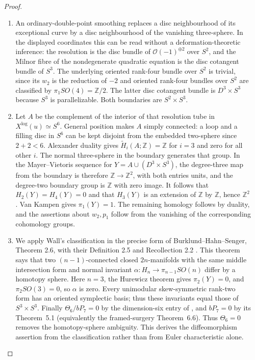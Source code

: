 \begin{proof}
\begin{enumerate}[label=\arabic*.,leftmargin=*]
\item An ordinary-double-point smoothing replaces a disc neighbourhood
of its exceptional curve by a disc neighbourhood of the vanishing
three-sphere. In the displayed coordinates this can be read
without a deformation-theoretic inference: the resolution is the
disc bundle of $\mathcal O(-1)^{\oplus2}$ over $S^2$, and the
Milnor fibre of the nondegenerate quadratic equation is the disc
cotangent bundle of $S^3$. The underlying oriented rank-four
bundle over $S^2$ is trivial, since its $w_2$ is the reduction of
$-2$ and oriented rank-four bundles over $S^2$ are classified by
$\pi_1SO(4)=\mathbb Z/2$. The latter disc cotangent bundle is
$D^3\times S^3$ because $S^3$ is parallelizable. Both boundaries
are $S^2\times S^3$.

\item Let $A$ be the complement of the interior of that resolution tube
in $X^{\log}(u)\simeq S^6$. General position makes $A$ simply connected:
a loop and a filling disc in $S^6$ can be kept disjoint from the
embedded two-sphere since $2+2<6$. Alexander duality gives
$\widetilde H_i(A;\mathbb Z)=\mathbb Z$ for $i=3$ and zero for
all other $i$. The normal three-sphere in the boundary generates
that group. In the Mayer--Vietoris sequence for
$Y=A\cup(D^3\times S^3)$, the degree-three map from the boundary
is therefore $\mathbb Z\to\mathbb Z^2$, with both entries units,
and the degree-two boundary group is $\mathbb Z$ with zero image.
It follows that $H_2(Y)=H_4(Y)=0$ and that $H_3(Y)$ is an extension
of $\mathbb Z$ by $\mathbb Z$, hence $\mathbb Z^2$.
Van Kampen gives $\pi_1(Y)=1$. The remaining homology follows by
duality, and the assertions about $w_2,p_1$ follow from the
vanishing of the corresponding cohomology groups.

\item We apply Wall's classification in the precise form of
Burklund--Hahn--Senger, Theorem 2.6, with their Definition 2.5 and
Recollection 2.2 \cite{BHS19}. This theorem says that two
$(n-1)$-connected closed $2n$-manifolds with the same middle
intersection form and normal invariant
$\alpha:H_n\to\pi_{n-1}SO(n)$ differ by a homotopy sphere.
Here $n=3$, the Hurewicz theorem gives $\pi_2(Y)=0$, and
$\pi_2SO(3)=0$, so $\alpha$ is zero. Every unimodular
skew-symmetric rank-two form has an oriented symplectic basis;
thus these invariants equal those of $S^3\times S^3$.
Finally $\Theta_6/bP_7=0$ by the dimension-six entry of
\cite[p.~512]{manKM63}, and $bP_7=0$ by its Theorem~5.1
(equivalently the framed-surgery Theorem~6.6). Thus $\Theta_6=0$
removes the homotopy-sphere ambiguity.
This derives the diffeomorphism assertion from the classification
rather than from Euler characteristic alone.
\end{enumerate}
\end{proof}

